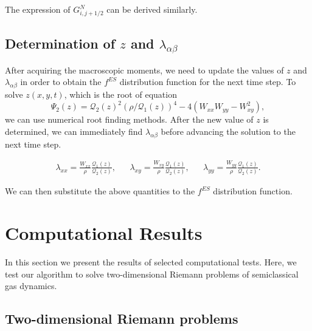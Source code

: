 \documentclass{rsproca}%
\begin{document}
The expression of $G_{i,j+1/2}^N$ can be derived similarly.

\subsection{ Determination of \texorpdfstring{$z$}{Lg} and \texorpdfstring{$\lambda_{\alpha \beta}$}{Lg} }

After acquiring the macroscopic moments, we need to update the values of $z$ and $\lambda_{\alpha \beta}$ in order to obtain the $f^{ES}$ distribution function for the next time step.  To solve $z(x,y,t)$, which is the root of equation
\begin{equation}
	\Psi_2(z)=\mathcal{Q}_{2}(z)^2 (\rho/\mathcal{Q}_{1}(z))^{4} - 4 (W_{xx} W_{yy} - W_{xy}^2),
\end{equation}
we can use numerical root finding methods.  After the new value of $z$ is determined, we can immediately find $\lambda_{\alpha \beta}$ before advancing the solution to the next time step.

\begin{align}
&\lambda_{xx} = \frac{W_{xx}}{\rho} \frac{\mathcal{Q}_{1}(z)}{\mathcal{Q}_{2}(z)},&
&\lambda_{xy} = \frac{W_{xy}}{\rho} \frac{\mathcal{Q}_{1}(z)}{\mathcal{Q}_{2}(z)},&
&\lambda_{yy} = \frac{W_{yy}}{\rho} \frac{\mathcal{Q}_{1}(z)}{\mathcal{Q}_{2}(z)}.&
\end{align}

We can then substitute the above quantities to the $f^{ES}$ distribution function.

\section{Computational Results}
\label{results}

In this section we present the results of selected computational tests.  Here, we test our algorithm to solve two-dimensional Riemann problems of semiclassical gas dynamics.

\subsection{Two-dimensional Riemann problems}
\label{Riemannp}
\end{document}
